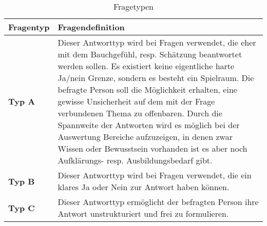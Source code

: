

\begin{table}[h]
\centering
\caption{Fragetypen}
\label{my-label}


\begin{tabular}{ |p{2cm}|p{14cm}| }


\hline
\rowcolor[HTML]{C0C0C0} 
\textbf{Fragentyp} & \textbf{Fragendefinition} \\ 
\hline


\textbf{Typ A}     & Dieser Antworttyp wird bei Fragen verwendet, die eher mit dem Bauchgefühl, resp. Schätzung beantwortet werden sollen. Es existiert keine eigentliche harte Ja/nein Grenze, sondern es besteht ein Spielraum. Die befragte Person soll die Möglichkeit erhalten, eine gewisse Unsicherheit auf dem mit der Frage verbundenen Thema zu offenbaren. Durch die Spannweite der Antworten wird es möglich bei der Auswertung Bereiche aufzuzeigen, in denen zwar Wissen oder Bewusstsein vorhanden ist es aber noch Aufklärungs- resp. Ausbildungsbedarf gibt. \\ 
\hline
\textbf{Typ B}     & Dieser Antworttyp wird bei Fragen verwendet, die ein klares Ja oder Nein zur Antwort haben können. \\ \hline
\textbf{Typ C}     & Dieser Antworttyp ermöglicht der befragten Person ihre Antwort unstrukturiert und frei zu formulieren.  \\ \hline

\end{tabular}
\end{table}


